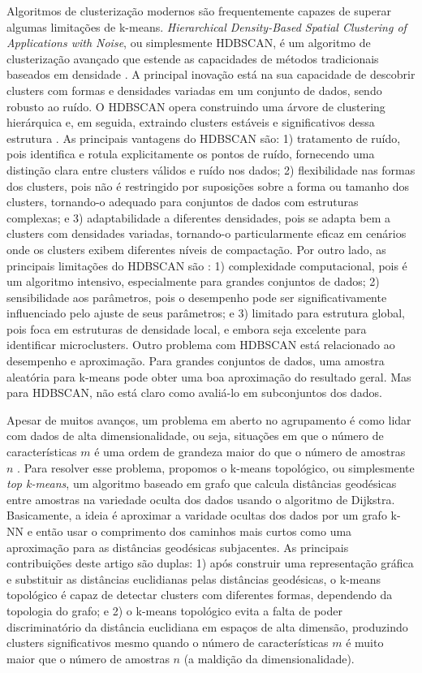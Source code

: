 \documentclass[sn-mathphys,Numbered]{sn-jnl}%
\theoremstyle{thmstyleone}%
\theoremstyle{thmstyletwo}%
\theoremstyle{thmstylethree}%
\begin{document}
Algoritmos de clusterização modernos são frequentemente capazes de superar algumas limitações de k-means. \textit{Hierarchical Density-Based Spatial Clustering of Applications with Noise}, ou simplesmente HDBSCAN, é um algoritmo de clusterização avançado que estende as capacidades de métodos tradicionais baseados em densidade \cite{HDBSCAN}. A principal inovação está na sua capacidade de descobrir clusters com formas e densidades variadas em um conjunto de dados, sendo robusto ao ruído. O HDBSCAN opera construindo uma árvore de clustering hierárquica e, em seguida, extraindo clusters estáveis e significativos dessa estrutura \cite{HDBSCAN*}. As principais vantagens do HDBSCAN são: 1) tratamento de ruído, pois identifica e rotula explicitamente os pontos de ruído, fornecendo uma distinção clara entre clusters válidos e ruído nos dados; 2) flexibilidade nas formas dos clusters, pois não é restringido por suposições sobre a forma ou tamanho dos clusters, tornando-o adequado para conjuntos de dados com estruturas complexas; e 3) adaptabilidade a diferentes densidades, pois se adapta bem a clusters com densidades variadas, tornando-o particularmente eficaz em cenários onde os clusters exibem diferentes níveis de compactação. Por outro lado, as principais limitações do HDBSCAN são \cite{HDBSCAN_}: 1) complexidade computacional, pois é um algoritmo intensivo, especialmente para grandes conjuntos de dados; 2) sensibilidade aos parâmetros, pois o desempenho pode ser significativamente influenciado pelo ajuste de seus parâmetros; e 3) limitado para estrutura global, pois foca em estruturas de densidade local, e embora seja excelente para identificar microclusters. Outro problema com HDBSCAN está relacionado ao desempenho e aproximação. Para grandes conjuntos de dados, uma amostra aleatória para k-means pode obter uma boa aproximação do resultado geral. Mas para HDBSCAN, não está claro como avaliá-lo em subconjuntos dos dados.

Apesar de muitos avanços, um problema em aberto no agrupamento é como lidar com dados de alta dimensionalidade, ou seja, situações em que o número de características $m$ é uma ordem de grandeza maior do que o número de amostras $n$ \cite{cluster_high_dim_1,cluster_high_dim_2,cluster_high_dim_3}. Para resolver esse problema, propomos o k-means topológico, ou simplesmente \textit{top k-means}, um algoritmo baseado em grafo que calcula distâncias geodésicas entre amostras na variedade oculta dos dados usando o algoritmo de Dijkstra. Basicamente, a ideia é aproximar a varidade ocultas dos dados por um grafo k-NN e então usar o comprimento dos caminhos mais curtos como uma aproximação para as distâncias geodésicas subjacentes. As principais contribuições deste artigo são duplas: 1) após construir uma representação gráfica e substituir as distâncias euclidianas pelas distâncias geodésicas, o k-means topológico é capaz de detectar clusters com diferentes formas, dependendo da topologia do grafo; e 2) o k-means topológico evita a falta de poder discriminatório da distância euclidiana em espaços de alta dimensão, produzindo clusters significativos mesmo quando o número de características $m$ é muito maior que o número de amostras $n$ (a maldição da dimensionalidade).
\end{document}
